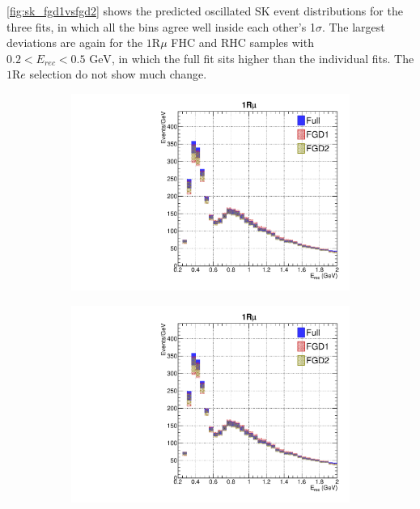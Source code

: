 \autoref{fig:sk_fgd1vsfgd2} shows the predicted oscillated SK event distributions for the three fits, in which all the bins agree well inside each other's 1$\sigma$. The largest deviations are again for the $1\text{R}\mu$ FHC and RHC samples with $0.2 < E_{rec}<0.5\text{ GeV}$, in which the full fit sits higher than the individual fits. The $1\text{R}e$ selection do not show much change.
\begin{figure}[h]
	\begin{subfigure}[t]{0.32\textwidth}
		\includegraphics[width=\textwidth, trim={0mm 0mm 0mm 0mm}, clip, page=1]{figures/mach3/data/alt/try_2017_fit_on_sk_spectra_posterior_sk_error_fgd1only_spectra_posterior_sk_error_fgd2only_spectra}
	\end{subfigure}
	\begin{subfigure}[t]{0.32\textwidth}
		\includegraphics[width=\textwidth, trim={0mm 0mm 0mm 0mm}, clip, page=2]{figures/mach3/data/alt/try_2017_fit_on_sk_spectra_posterior_sk_error_fgd1only_spectra_posterior_sk_error_fgd2only_spectra}

\end{subfigure}
\end{figure}
